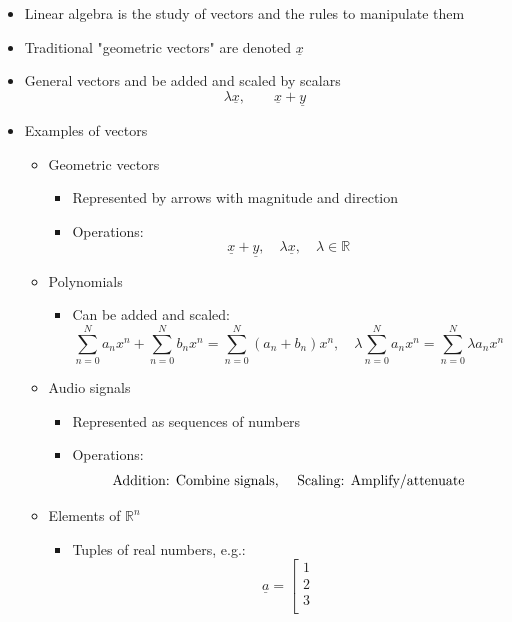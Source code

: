 \documentclass{article}
\begin{document}
\begin{itemize}
\subsection{Slide 4 (Linear Algebra: Vectors and Matrices)}
    \item Linear algebra is the study of vectors and the rules to manipulate them
    \item Traditional "geometric vectors" are denoted $\underline{x}$
    \item General vectors and be added and scaled by scalars
    \[ \lambda \underline{x}, \qquad \underline{x} + \underline{y} \]
    \item Examples of vectors
    \begin{itemize}
        \item Geometric vectors
        \begin{itemize}
            \item Represented by arrows with magnitude and direction
            \item Operations:
            \[ \underline{x} + \underline{y}, \quad \lambda \underline{x}, \quad \lambda \in \mathbb{R} \]
        \end{itemize}
        \item Polynomials
        \begin{itemize}
            \item Can be added and scaled:
            \[ \sum_{n=0}^N a_nx^n + \sum_{n=0}^N b_nx^n = \sum_{n=0}^N (a_n + b_n)x^n, \quad \lambda \sum_{n=0}^N a_nx^n = \sum_{n=0}^N \lambda a_nx^n \]
        \end{itemize}
        \item Audio signals
        \begin{itemize}
            \item Represented as sequences of numbers
            \item Operations:
            \[ \text{Addition: Combine signals, \quad    Scaling: Amplify/attenuate} \]
        \end{itemize}
        \item Elements of $\mathbb{R}^n$
        \begin{itemize}
            \item Tuples of real numbers, e.g.:
            \[ \underline{a} = \left[ \begin{array}{c}
                1 \\
                2 \\ 
                3 \\

\end{array}\]
\end{itemize}
\end{itemize}
\end{itemize}
\end{document}
